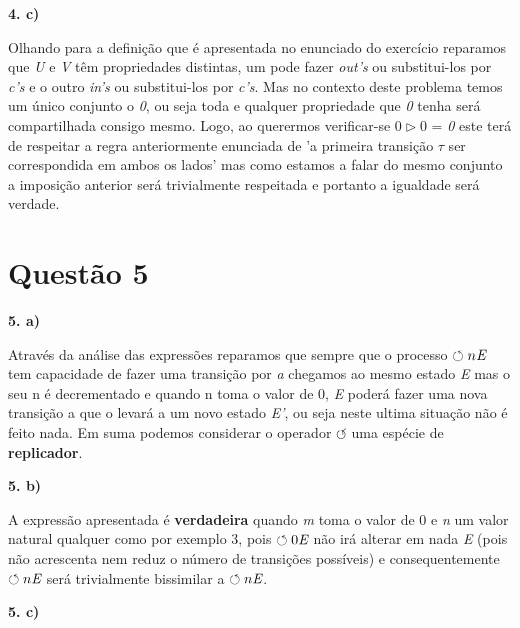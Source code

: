 \documentclass[11pt,a4paper]{report}
\begin{document}
\textbf{4. c)}

Olhando para a definição que é apresentada no enunciado do exercício reparamos que \emph{U} e \emph{V} têm propriedades distintas, um pode fazer \emph{out's} ou substitui-los por \emph{c's} e o outro \emph{in's} ou substitui-los por \emph{c's}. Mas no contexto deste problema temos um único conjunto o \emph{0}, ou seja toda e qualquer propriedade que \emph{0} tenha será compartilhada consigo mesmo. Logo, ao querermos verificar-se \emph{$0\triangleright 0$} = \emph{0} este terá de respeitar a regra anteriormente enunciada de 'a primeira transição $\tau$ ser correspondida em ambos os lados' mas como estamos a falar do mesmo conjunto a imposição anterior será trivialmente respeitada e portanto a igualdade será verdade.
 
\section{Questão 5}

\textbf{5. a)} 

Através da análise das expressões reparamos que sempre que o processo $\circlearrowleft n \emph{E}$ tem capacidade de fazer uma transição por \emph{a} chegamos ao mesmo estado \emph{E} mas o seu n é decrementado e quando n toma o valor de 0, \emph{E} poderá fazer uma nova transição a que o levará a um novo estado \emph{E'}, ou seja neste ultima situação não é feito nada. Em suma podemos considerar o operador $\circlearrowleft$ uma espécie de \textbf{replicador}.

\newpage

\textbf{5. b)}

A expressão apresentada é \textbf{verdadeira} quando \emph{m} toma o valor de 0 e \emph{n} um valor natural qualquer como por exemplo 3, pois $\circlearrowleft 0 \emph{E}$ não irá alterar em nada \emph{E} (pois não acrescenta nem reduz o número de transições possíveis) e consequentemente $\circlearrowleft n \emph{E}$ será trivialmente bissimilar a $\circlearrowleft n \emph{E}$.

\textbf{5. c)}
\end{document}
